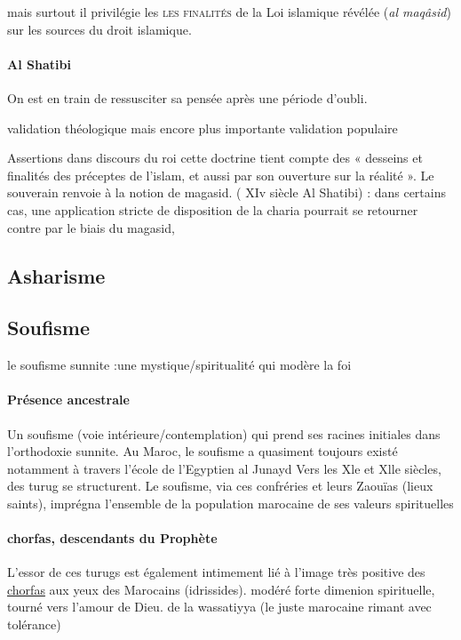 mais surtout il privilégie les \textsc{les finalités} de la Loi islamique révélée (\textit{al maqâsid}) sur les sources du droit islamique.


\paragraph{Al Shatibi} On est en train de ressusciter sa pensée après une période d'oubli.

\begin{Ex}
    validation théologique mais encore plus importante validation populaire
\end{Ex}

  Assertions dans discours du roi cette doctrine tient compte des « desseins et finalités des préceptes de l'islam, et aussi par son ouverture sur la réalité ».
  Le souverain renvoie à la notion de magasid. ( XIv siècle
Al Shatibi) : dans certains cas, une application stricte de disposition de la charia pourrait se retourner contre par le biais du magasid,

\subsection{Asharisme}

\subsection{Soufisme}

\begin{Synthesis}
    le soufisme sunnite :une mystique/spiritualité qui modère la foi
\end{Synthesis}

\paragraph{Présence ancestrale}
 Un soufisme (voie intérieure/contemplation) qui prend ses racines initiales dans l'orthodoxie sunnite.
  Au Maroc, le soufisme a quasiment toujours existé notamment à travers l'école de l'Egyptien al Junayd   Vers les Xle et Xlle siècles, des turug se structurent.
 Le soufisme, via ces confréries et leurs Zaouïas (lieux saints), imprégna l'ensemble de la population marocaine de ses valeurs spirituelles 
 
 \paragraph{chorfas, descendants du Prophète} L'essor de ces turugs est également intimement lié à l'image très positive des \href{https://fr.wikipedia.org/wiki/Ch%C3%A9rif}{chorfas} aux yeux des Marocains (idrissides).
 modéré forte dimenion spirituelle, tourné vers l'amour de Dieu.
de la wassatiyya (le juste
marocaine rimant avec tolérance)

